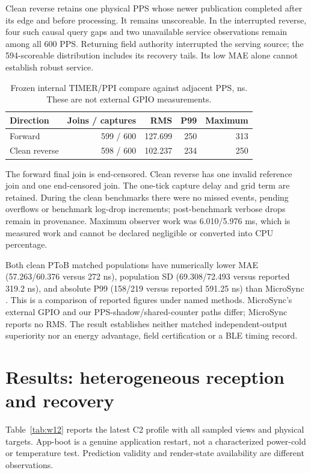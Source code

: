 \documentclass[11pt,letterpaper]{article}
\newcommand{\page}{\clearpage}
\begin{document}
Clean reverse retains one physical PPS whose newer publication completed after its edge and before processing. It remains unscoreable. In the interrupted reverse, four such causal query gaps and two unavailable service observations remain among all 600 PPS. Returning field authority interrupted the serving source; the 594-scoreable distribution includes its recovery tails. Its low MAE alone cannot establish robust service.


\begin{table}[h]\centering\small
\caption{Frozen internal TIMER/PPI compare against adjacent PPS, ns. These are not external GPIO measurements.}\label{tab:compare}
\begin{tabular}{@{}lrrrr@{}}\toprule
Direction & Joins / captures & RMS & P99 & Maximum \\\midrule
Forward & 599 / 600 & 127.699 & 250 & 313 \\
Clean reverse & 598 / 600 & 102.237 & 234 & 250 \\\bottomrule
\end{tabular}
\end{table}

The forward final join is end-censored. Clean reverse has one invalid reference join and one end-censored join. The one-tick capture delay and grid term are retained. During the clean benchmarks there were no missed events, pending overflows or benchmark log-drop increments; post-benchmark verbose drops remain in provenance. Maximum observer work was 6.010/5.976 ms, which is measured work and cannot be declared negligible or converted into CPU percentage.

Both clean PToB matched populations have numerically lower MAE (57.263/60.376 versus 272 ns), population SD (69.308/72.493 versus reported 319.2 ns), and absolute P99 (158/219 versus reported 591.25 ns) than MicroSync \cite{micro}. This is a comparison of reported figures under named methods. MicroSync's external GPIO and our PPS-shadow/shared-counter paths differ; MicroSync reports no RMS. The result establishes neither matched independent-output superiority nor an energy advantage, field certification or a BLE timing record.
\page
\section{Results: heterogeneous reception and recovery}
Table~\ref{tab:w12} reports the latest C2 profile with all sampled views and physical targets. App-boot is a genuine application restart, not a characterized power-cold or temperature test. Prediction validity and render-state availability are different observations.
\end{document}
